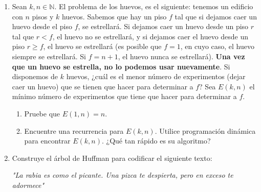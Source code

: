 \documentclass[letterpaper,11pt]{article}
\begin{document}
\begin{enumerate}
    \item Sean $k, n \in \mathbb{N}$. El problema de los huevos, es el 
    siguiente: tenemos un edificio con $n$ pisos y $k$ huevos. Sabemos que hay 
    un piso $f$ tal que si dejamos caer un huevo desde el piso $f$, se 
    estrellará. Si dejamos caer un huevo desde un piso $r$ tal que $r < f$, el 
    huevo no se estrellará, y si dejamos caer el huevo desde un piso 
    $r \geq f$, el huevo se estrellará (es posible que $f = 1$, en cuyo caso, 
    el huevo siempre se estrellará. Si $f = n+1$, el huevo nunca se estrellará).
    \textbf{Una vez que un huevo se estrella, no lo podemos usar nuevamente}. 
    Si disponemos de $k$ huevos, ¿cuál es el menor número de experimentos
    (dejar caer un huevo) que se tienen que hacer para determinar a $f$? Sea 
    $E(k, n)$ el mínimo número de experimentos que tiene que hacer para 
    determinar a $f$.
    \begin{enumerate}
        \item Pruebe que $E(1, n) = n$.

        \item Encuentre una recurrencia para $E(k,n)$. Utilice programación 
        dinámica para encontrar $E(k,n)$. ¿Qué tan rápido es su algoritmo?
    \end{enumerate}

    \item Construye el árbol de Huffman para codificar el siguiente texto:
    \begin{center}
        \textit{"La rabia es como el picante. Una pizca te despierta, pero
        en exceso te adormece"}
    \end{center}
    

\end{enumerate}
\end{document}
